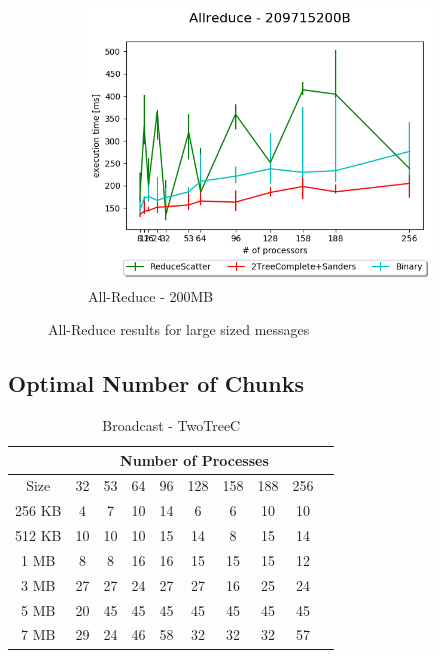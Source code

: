 \documentclass[sigplan,review,anonymous]{acmart}\settopmatter{printfolios=true,printccs=false,printacmref=false}
\begin{document}
\begin{figure}
\begin{subfigure}{0.5\textwidth}
  \centering
  \includegraphics[width=0.5\linewidth]{images/Results/AllReduce/AllReduceComp2_209715200B.png}
  \caption{All-Reduce - 200MB}
  \label{reduce-selected-7MB}
\end{subfigure}
\caption{All-Reduce results for large sized messages}
\label{graph-reduce-medium2-selected}
\end{figure}

\subsection{Optimal Number of Chunks}

\begin{table}[]
\caption{Broadcast - TwoTreeC}
\begin{center}
\begin{tabular}{|c|c|c|c|c|c|c|c|c|c|}
\hline
& \multicolumn{8}{c|}{Number of Processes} \\
\hline
Size & 32 & 53 & 64 & 96 & 128 & 158 & 188 & 256\\
\hline
 256 KB & 4 & 7 & 10 & 14 & 6 & 6 & 10 & 10\\
 512 KB & 10 & 10 & 10 & 15 & 14 & 8 & 15 & 14\\
 1 MB & 8 & 8 & 16 & 16 & 15 & 15 & 15 & 12\\
 3 MB & 27 & 27 & 24 & 27 & 27 & 16 & 25 & 24\\
 5 MB & 20 & 45 & 45 & 45 & 45 & 45 & 45 & 45\\
 7 MB & 29 & 24 & 46 & 58 & 32 & 32 & 32 & 57\\
\hline
\end{tabular}
\end{center}
\end{table}
\end{document}
